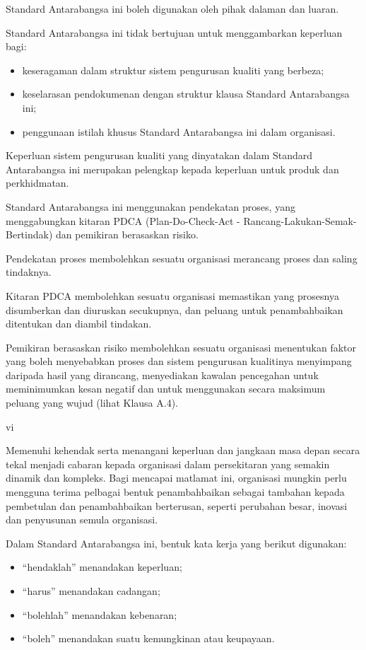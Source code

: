 \documentclass[
]{article}
\providecommand{\tightlist}{%
  \setlength{\itemsep}{0pt}\setlength{\parskip}{0pt}}
\begin{document}
Standard Antarabangsa ini boleh digunakan oleh pihak dalaman dan luaran.

Standard Antarabangsa ini tidak bertujuan untuk menggambarkan keperluan
bagi:

\begin{itemize}
\tightlist
\item
  keseragaman dalam struktur sistem pengurusan kualiti yang berbeza;
\item
  keselarasan pendokumenan dengan struktur klausa Standard Antarabangsa
  ini;
\item
  penggunaan istilah khusus Standard Antarabangsa ini dalam organisasi.
\end{itemize}

Keperluan sistem pengurusan kualiti yang dinyatakan dalam Standard
Antarabangsa ini merupakan pelengkap kepada keperluan untuk produk dan
perkhidmatan.

Standard Antarabangsa ini menggunakan pendekatan proses, yang
menggabungkan kitaran PDCA (Plan-Do-Check-Act -
Rancang-Lakukan-Semak-Bertindak) dan pemikiran berasaskan risiko.

Pendekatan proses membolehkan sesuatu organisasi merancang proses dan
saling tindaknya.

Kitaran PDCA membolehkan sesuatu organisasi memastikan yang prosesnya
disumberkan dan diuruskan secukupnya, dan peluang untuk penambahbaikan
ditentukan dan diambil tindakan.

Pemikiran berasaskan risiko membolehkan sesuatu organisasi menentukan
faktor yang boleh menyebabkan proses dan sistem pengurusan kualitinya
menyimpang daripada hasil yang dirancang, menyediakan kawalan pencegahan
untuk meminimumkan kesan negatif dan untuk menggunakan secara maksimum
peluang yang wujud (lihat Klausa A.4).

vi

Memenuhi kehendak serta menangani keperluan dan jangkaan masa depan
secara tekal menjadi cabaran kepada organisasi dalam persekitaran yang
semakin dinamik dan kompleks. Bagi mencapai matlamat ini, organisasi
mungkin perlu mengguna terima pelbagai bentuk penambahbaikan sebagai
tambahan kepada pembetulan dan penambahbaikan berterusan, seperti
perubahan besar, inovasi dan penyusunan semula organisasi.

Dalam Standard Antarabangsa ini, bentuk kata kerja yang berikut
digunakan:

\begin{itemize}
\tightlist
\item
  ``hendaklah'' menandakan keperluan;
\item
  ``harus'' menandakan cadangan;
\item
  ``bolehlah'' menandakan kebenaran;
\item
  ``boleh'' menandakan suatu kemungkinan atau keupayaan.
\end{itemize}
\end{document}
